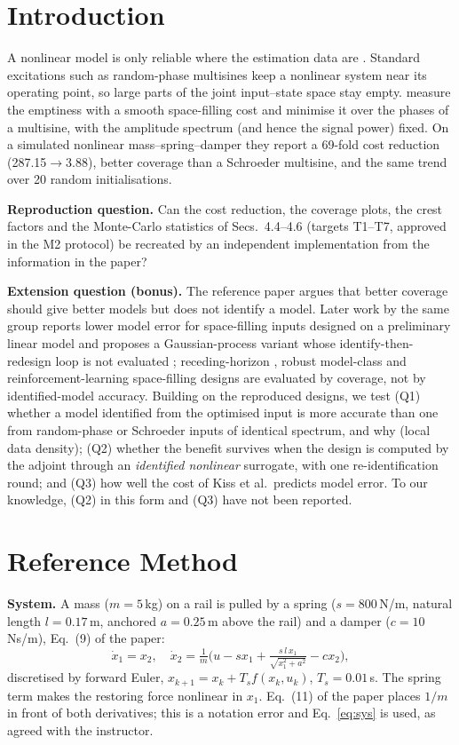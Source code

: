 \documentclass[10pt,a4paper,twocolumn]{article}
\begin{document}
\section{Introduction}
A nonlinear model is only reliable where the estimation data are \citep{Schoukens2019}. Standard excitations
such as random-phase multisines keep a nonlinear system near its operating point, so large parts of the
joint input--state space stay empty. \citet{Kiss2024} measure the emptiness with a smooth space-filling cost
and minimise it over the phases of a multisine, with the amplitude spectrum (and hence the signal power)
fixed. On a simulated nonlinear mass--spring--damper they report a 69-fold cost reduction
(287.15$\to$3.88), better coverage than a Schroeder multisine, and the same trend over 20 random
initialisations.

\textbf{Reproduction question.} Can the cost reduction, the coverage plots, the crest factors and the
Monte-Carlo statistics of Secs.~4.4--4.6 (targets T1--T7, approved in the M2 protocol) be recreated by an
independent implementation from the information in the paper?

\textbf{Extension question (bonus).} The reference paper argues that better coverage should give better
models but does not identify a model. Later work by the same group reports lower model error for
space-filling inputs designed on a preliminary linear model \citep{Kiss2026} and proposes a Gaussian-process
variant whose identify-then-redesign loop is not evaluated \citep{Liu2025}; receding-horizon
\citep{Herkersdorf2025}, robust model-class \citep{Kiss2026b} and reinforcement-learning \citep{Witmeur2026}
space-filling designs are evaluated by coverage, not by identified-model accuracy. Building on the reproduced designs, we test (Q1) whether
a model identified from the optimised input is more accurate than one from random-phase or Schroeder inputs of
identical spectrum, and why (local data density); (Q2) whether the benefit survives when the design is
computed by the adjoint through an \emph{identified nonlinear} surrogate, with one re-identification round;
and (Q3) how well the cost of Kiss et al.\ predicts model error. To our knowledge, (Q2) in this form and
(Q3) have not been reported.

\section{Reference Method}
\textbf{System.} A mass ($m=5$\,kg) on a rail is pulled by a spring ($s=800$\,N/m, natural length
$l=0.17$\,m, anchored $a=0.25$\,m above the rail) and a damper ($c=10$\,Ns/m), Eq.~(9) of the paper:
\begin{equation}
\dot x_1=x_2,\quad \dot x_2=\tfrac{1}{m}\Big(u-sx_1+\tfrac{s\,l\,x_1}{\sqrt{x_1^2+a^2}}-cx_2\Big),
\label{eq:sys}\end{equation}
discretised by forward Euler, $x_{k+1}=x_k+T_sf(x_k,u_k)$, $T_s=0.01$\,s. The spring term makes the
restoring force nonlinear in $x_1$. Eq.~(11) of the paper places $1/m$ in front of both derivatives; this is
a notation error and Eq.~\eqref{eq:sys} is used, as agreed with the instructor.
\end{document}
